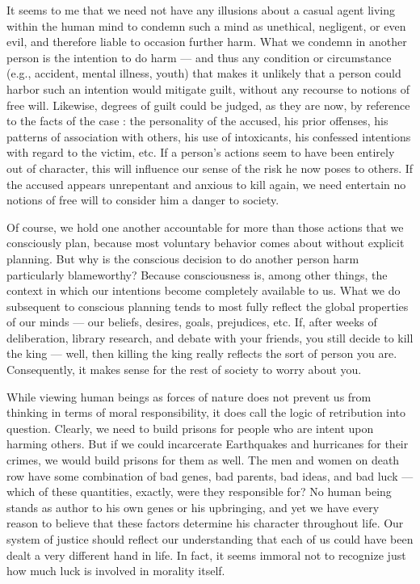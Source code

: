 \documentclass[a4paper,14pt]{extarticle}
\begin{document}
It seems to me that we need not have any illusions about a casual agent living within the human mind to condemn such a mind as unethical, negligent, or even evil, and therefore liable to occasion further harm.
What we condemn in another person is the intention to do harm --- and thus any condition or circumstance (e.g., accident, mental illness, youth) that makes it unlikely that a person could harbor such an intention would mitigate guilt, without any recourse to notions of free will.
Likewise, degrees of guilt could be judged, as they are now, by reference to the facts of the case :
the personality of the accused, his prior offenses, his patterns of association with others, his use of intoxicants, his confessed intentions with regard to the victim, etc.
If a person’s actions seem to have been entirely out of character, this will influence our sense of the risk he now poses to others.
If the accused appears unrepentant and anxious to kill again, we need entertain no notions of free will to consider him a danger to society.

Of course, we hold one another accountable for more than those actions that we consciously plan, because most voluntary behavior comes about without explicit planning.
But why is the conscious decision to do another person harm particularly blameworthy?
Because consciousness is, among other things, the context in which our intentions become completely available to us.
What we do subsequent to conscious planning tends to most fully reflect the global properties of our minds --- our beliefs, desires, goals, prejudices, etc.
If, after weeks of deliberation, library research, and debate with your friends, you still decide to kill the king --- well, then killing the king really reflects the sort of person you are.
Consequently, it makes sense for the rest of society to worry about you.

While viewing human beings as forces of nature does not prevent us from thinking in terms of moral responsibility, it does call the logic of retribution into question.
Clearly, we need to build prisons for people who are intent upon harming others.
But if we could incarcerate Earthquakes and hurricanes for their crimes, we would build prisons for them as well.
The men and women on death row have some combination of bad genes, bad parents, bad ideas, and bad luck --- which of these quantities, exactly, were they responsible for?
No human being stands as author to his own genes or his upbringing, and yet we have every reason to believe that these factors determine his character throughout life.
Our system of justice should reflect our understanding that each of us could have been dealt a very different hand in life.
In fact, it seems immoral not to recognize just how much luck is involved in morality itself.
\end{document}
